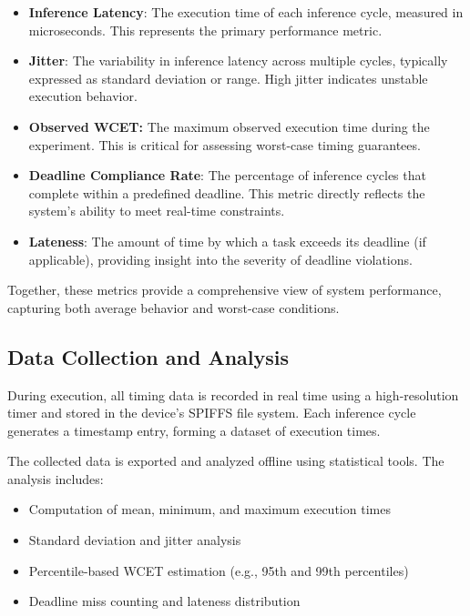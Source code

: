 \documentclass[conference]{IEEEtran}
\begin{document}
\begin{itemize}
    \item \textbf{Inference Latency}: The execution time of each inference cycle, measured in microseconds. This represents the primary performance metric.
    
    \item \textbf{Jitter}: The variability in inference latency across multiple cycles, typically expressed as standard deviation or range. High jitter indicates unstable execution behavior.
    
    \item \textbf{Observed WCET:} %
    The maximum observed execution time during the experiment. This is critical for assessing worst-case timing guarantees.
    
    \item \textbf{Deadline Compliance Rate}: The percentage of inference cycles that complete within a predefined deadline. This metric directly reflects the system’s ability to meet real-time constraints.
    
    \item \textbf{Lateness}: The amount of time by which a task exceeds its deadline (if applicable), providing insight into the severity of deadline violations.
\end{itemize}

Together, these metrics provide a comprehensive view of system performance, capturing both average behavior and worst-case conditions.

\subsection{Data Collection and Analysis}

During execution, all timing data is recorded in real time using a high-resolution timer and stored in the device’s SPIFFS file system. Each inference cycle generates a timestamp entry, forming a dataset of execution times.

The collected data is exported and analyzed offline using statistical tools. The analysis includes:

\begin{itemize}
    \item Computation of mean, minimum, and maximum execution times
    \item Standard deviation and jitter analysis
    \item Percentile-based WCET estimation (e.g., 95th and 99th percentiles)
    \item Deadline miss counting and lateness distribution
\end{itemize}
\end{document}
